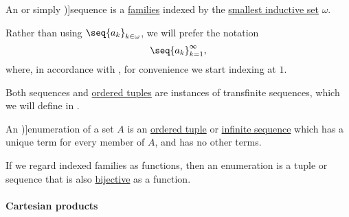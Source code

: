\begin{definition}\label{def:sequence}
  An  or simply \term[ru=последовательность (\cite[10]{Архангельский1988Множества})]{sequence} is a \hyperref[def:indexed_family]{families} indexed by the \hyperref[thm:smallest_inductive_set_existence]{smallest inductive set} \( \omega \).

  Rather than using \( \seq{ a_k }_{k \in \omega} \), we will prefer the notation
  \begin{equation*}
    \seq{ a_k }_{k=1}^\infty,
  \end{equation*}
  where, in accordance with , for convenience we start indexing at \( 1 \).
\end{definition}
\begin{comments}
  \item Both sequences and \hyperref[def:ordered_tuple]{ordered tuples} are instances of transfinite sequences, which we will define in .
\end{comments}

\begin{definition}\label{def:enumeration}\mimprovised
  An \term[en=enumeration (\cite[190]{Kleene2002Logic})]{enumeration} of a set \( A \) is an \hyperref[def:ordered_tuple]{ordered tuple} or \hyperref[def:sequence]{infinite sequence} which has a unique term for every member of \( A \), and has no other terms.
\end{definition}
\begin{comments}
  \item If we regard indexed families as functions, then an enumeration is a tuple or sequence that is also \hyperref[def:function_invertibility/bijective]{bijective} as a function.
\end{comments}

\paragraph{Cartesian products}

